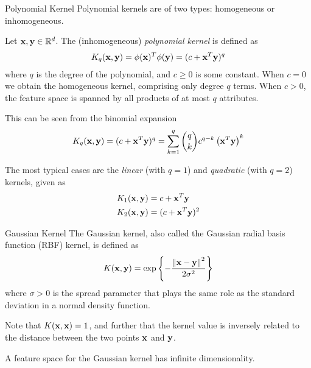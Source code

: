 \begin{frame}{Polynomial Kernel}
  \small
Polynomial kernels are of two types: homogeneous or
inhomogeneous.


\medskip
Let $\mathbf{x}, \mathbf{y} \in {\mathord{\mathbb R}}^d$.
The (inhomogeneous) {\em polynomial
kernel} is def\/{i}ned as
  \begin{align*}
    K_q(\mathbf{x}, \mathbf{y})= \phi(\mathbf{x})^T \phi(\mathbf{y}) =
    (c+\mathbf{x}^{T}\mathbf{y})^q
  \end{align*}
  where $q$ is the degree of the polynomial, and $c \ge 0$ is some
  constant. When $c=0$ we obtain the homogeneous kernel,
  comprising only degree $q$ terms. When
  $c>0$, the feature space is spanned
  by all products of at most $q$ attributes.
  
  This can be seen
  from the binomial expansion
  \begin{align*}
      K_q(\mathbf{x}, \mathbf{y}) = (c+\mathbf{x}^T\mathbf{y})^q
      = \sum_{k=1}^q {q \choose k} c^{q-k} \left( \mathbf{x}^T\mathbf{y} \right)^k
  \end{align*}

\medskip
The most typical cases are the {\em linear} (with $q=1$) and
  {\em quadratic} (with $q=2$) kernels, given as
  \begin{align*}
      K_1(\mathbf{x}, \mathbf{y}) &= c+ \mathbf{x}^T\mathbf{y}\\
     K_2(\mathbf{x}, \mathbf{y}) &= (c+ \mathbf{x}^T\mathbf{y})^2
  \end{align*}

\end{frame}


\begin{frame}{Gaussian Kernel}
The Gaussian kernel, also called the Gaussian radial basis
function (RBF) kernel,
is def\/{i}ned as
  \begin{align*}
      K(\mathbf{x}, \mathbf{y}) =
    \exp\left\{-\frac{\left\lVert\mathbf{x}-\mathbf{y}\right\rVert^2}{2\sigma^2} \right\}
  \end{align*}
where $\sigma > 0$ is the spread parameter that plays the same
role as the standard deviation in a normal density function.

\medskip
Note that $K(\mathbf{x},\mathbf{x})=1$, and further that the kernel
value is inversely related to the distance between the two
points $\mathbf{x}$ and $\mathbf{y}$.

\medskip
A feature space for the Gaussian
kernel has inf\/{i}nite dimensionality. 
\end{frame}


